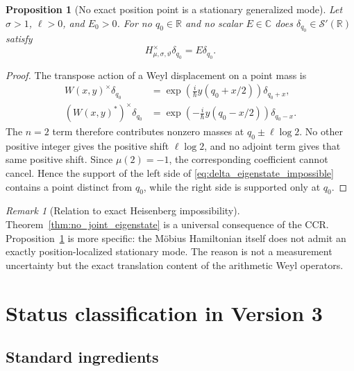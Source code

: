 \documentclass[11pt]{amsart}
\numberwithin{equation}{section}
\theoremstyle{plain}
\newtheorem{proposition}[theorem]{Proposition}
\theoremstyle{definition}
\theoremstyle{remark}
\newtheorem{remark}[theorem]{Remark}
\newcommand{\R}{\mathbb{R}}
\newcommand{\C}{\mathbb{C}}
\newcommand{\Sch}{\mathcal{S}}
\begin{document}
\begin{proposition}[No exact position point is a stationary generalized mode]
\label{prop:no_delta_eigenstate}
Let \(\sigma>1\), \(\ell>0\), and \(E_0>0\).  For no
\(q_0\in\R\) and no scalar \(E\in\C\) does
\(\delta_{q_0}\in\Sch'(\R)\) satisfy
\begin{equation}
H^{\times}_{\mu,\sigma,\vartheta}\delta_{q_0}
=E\delta_{q_0}.
\label{eq:delta_eigenstate_impossible}
\end{equation}
\end{proposition}

\begin{proof}
The transpose action of a Weyl displacement on a point mass is
\begin{align}
W(x,y)^{\times}\delta_{q_0}
&=
\exp\left(\frac{i}{\hbar}y(q_0+x/2)\right)
\delta_{q_0+x},
\label{eq:W_delta_action}\\
(W(x,y)^*)^{\times}\delta_{q_0}
&=
\exp\left(-\frac{i}{\hbar}y(q_0-x/2)\right)
\delta_{q_0-x}.
\label{eq:Wstar_delta_action}
\end{align}
The \(n=2\) term therefore contributes nonzero masses at
\(q_0\pm\ell\log2\).  No other positive integer gives the positive
shift \(\ell\log2\), and no adjoint term gives that same positive shift.
Since \(\mu(2)=-1\), the corresponding coefficient cannot cancel.  Hence
the support of the left side of \eqref{eq:delta_eigenstate_impossible}
contains a point distinct from \(q_0\), while the right side is supported
only at \(q_0\).
\end{proof}

\begin{remark}[Relation to exact Heisenberg impossibility]
\label{rem:nonlocalization_relation}
Theorem~\ref{thm:no_joint_eigenstate} is a universal consequence of the CCR.
Proposition~\ref{prop:no_delta_eigenstate} is more specific: the M\"obius
Hamiltonian itself does not admit an exactly position-localized stationary
mode.  The reason is not a measurement uncertainty but the exact translation
content of the arithmetic Weyl operators.
\end{remark}

\section{Status classification in Version 3}
\label{sec:status_classification}

\subsection{Standard ingredients}
\label{subsec:standard_ingredients}
\end{document}
